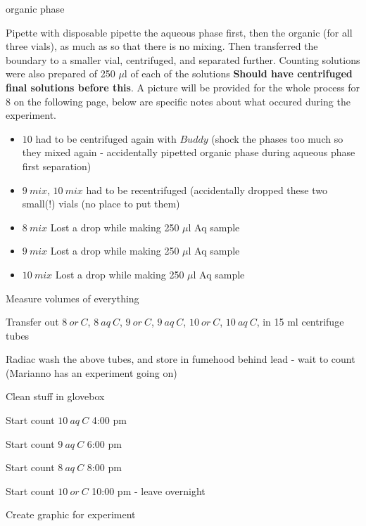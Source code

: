 \documentclass[idxtotoc,hyperref,openany,oneside]{labbook} %
\newcommand{\cmark}{\ding{51}}%
\newcommand{\done}{\rlap{$\square$}{\raisebox{2pt}{\large\hspace{1pt}\cmark}}%
  \hspace{-2.5pt}}
\begin{document}
\begin{todolist}
\begin{itemize}
{    organic phase}
  \end{itemize}
\item[\done]{Pipette with disposable pipette the aqueous phase
  first, then the organic (for all three vials),
  as much as so that there is no mixing.
  Then transferred the boundary to a smaller vial, centrifuged,
  and separated further. Counting solutions were
  also prepared of 250 $\mu$l of each of the solutions
  \textbf{Should have centrifuged final solutions before this}.
  A picture will be provided for the whole process for $\boxed{8}$
  on the following page, below are specific notes about what
  occured during the experiment.}
  \begin{itemize}
  \item{$\boxed{10}$ had to be centrifuged again with $\boxed{Buddy}$
    (shock the phases too much so they mixed again - accidentally pipetted
    organic phase during aqueous phase first separation)}
  \item{$\boxed{9\ mix}$, $\boxed{10\ mix}$ had to be recentrifuged
    (accidentally dropped these two small(!) vials (no place to put them)}
  \item{$\boxed{8\ mix}$ Lost a drop while making 250 $\mu$l Aq sample}
  \item{ $\boxed{9\ mix}$ Lost a drop while making 250 $\mu$l Aq sample}
  \item{$\boxed{10\ mix}$ Lost a drop while making 250 $\mu$l Aq sample}
  \end{itemize}
\item{Measure volumes of everything}
\item[\done]{Transfer out $\boxed{8\ or\ C}$, $\boxed{8\ aq\ C}$,
  $\boxed{9\ or\ C}$, $\boxed{9\ aq\ C}$, $\boxed{10\ or\ C}$,
  $\boxed{10\ aq\ C}$, in 15 ml centrifuge tubes}
\item[\done]{Radiac wash the above tubes, and store in fumehood behind
  lead - wait to count (Marianno has an experiment going on)}
\item[\done]{Clean stuff in glovebox}
\item[\done]{Start count $\boxed{10\ aq\ C}$ 4:00 pm}
\item{Start count $\boxed{9\ aq\ C}$ 6:00 pm}
\item{Start count $\boxed{8\ aq\ C}$ 8:00 pm}
\item{Start count $\boxed{10\ or\ C}$ 10:00 pm - leave overnight}
\item[\done]{Create graphic for experiment}
\end{todolist}
\end{document}
